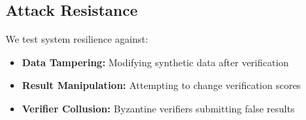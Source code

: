 \subsection{Attack Resistance}

We test system resilience against:
\begin{itemize}
    \item \textbf{Data Tampering:} Modifying synthetic data after verification
    \item \textbf{Result Manipulation:} Attempting to change verification scores
    \item \textbf{Verifier Collusion:} Byzantine verifiers submitting false results
\end{itemize}
